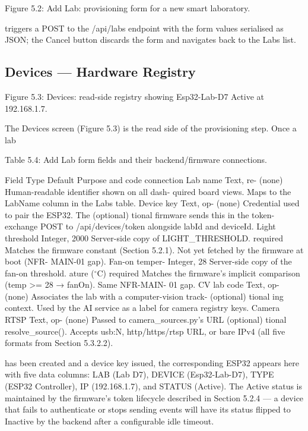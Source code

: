 Figure 5.2: Add Lab: provisioning form for a new smart laboratory.


triggers a POST to the /api/labs endpoint with the form values serialised as JSON; the
Cancel button discards the form and navigates back to the Labs list.



\subsection{Devices --- Hardware Registry}





Figure 5.3: Devices: read-side registry showing Esp32-Lab-D7 Active at 192.168.1.7.

The Devices screen (Figure 5.3) is the read side of the provisioning step. Once a lab



Table 5.4: Add Lab form ﬁelds and their backend/ﬁrmware connections.

Field Type Default Purpose and code connection
Lab name Text, re- (none) Human-readable identiﬁer shown on all dash-
quired board views. Maps to the LabName column in
the Labs table.
Device key Text, op- (none) Credential used to pair the ESP32. The
(optional) tional ﬁrmware sends this in the token-exchange
POST to /api/devices/token alongside
labId and deviceId.
Light threshold Integer, 2000 Server-side copy of LIGHT\_THRESHOLD.
required Matches the ﬁrmware constant (Section 5.2.1).
Not yet fetched by the ﬁrmware at boot (NFR-
MAIN-01 gap).
Fan-on temper- Integer, 28 Server-side copy of the fan-on threshold.
ature ($^\circ$C) required Matches the ﬁrmware's implicit comparison
(temp >= 28 → fanOn). Same NFR-MAIN-
01 gap.
CV lab code Text, op- (none) Associates the lab with a computer-vision track-
(optional) tional ing context. Used by the AI service as a label
for camera registry keys.
Camera RTSP Text, op- (none) Passed to camera\_sources.py's
URL (optional) tional resolve\_source(). Accepts usb:N,
http/https/rtsp URL, or bare IPv4 (all ﬁve
formats from Section 5.3.2.2).




has been created and a device key issued, the corresponding ESP32 appears here with ﬁve
data columns: LAB (Lab D7), DEVICE (Esp32-Lab-D7), TYPE (ESP32 Controller), IP
(192.168.1.7), and STATUS (Active). The Active status is maintained by the ﬁrmware's
token lifecycle described in Section 5.2.4 --- a device that fails to authenticate or stops
sending events will have its status ﬂipped to Inactive by the backend after a conﬁgurable
idle timeout.

